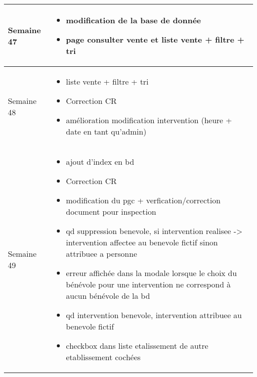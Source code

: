\documentclass [a4paper] {article}
\begin{document}
\begin{longtable}{|>{\columncolor{gray!40}}p{2cm}|p{12cm}|}
	Semaine 47 & \begin{itemize}
	\item  modification de la base de donnée
	\item  page consulter vente et liste vente + filtre + tri
	\end{itemize} \\
	\hline

	Semaine 48 & \begin{itemize}
	\item liste vente + filtre + tri
	\item Correction CR
	\item amélioration modification intervention (heure + date en tant qu'admin)
	\end{itemize} \\
	\hline

	Semaine 49 & \begin{itemize}
	\item ajout d'index en bd
	\item Correction CR
	\item modification du pgc + verfication/correction document pour inspection
	\item qd suppression benevole, si intervention realisee -> intervention affectee au benevole fictif sinon attribuee a personne
	\item erreur affichée dans la modale lorsque le choix du bénévole pour une intervention ne correspond à aucun bénévole de la bd
	\item qd intervention benevole, intervention attribuee au benevole fictif
	\item checkbox dans liste etalissement de autre etablissement cochées
	\end{itemize} \\
	\hline
\end{longtable}
\end{document}

